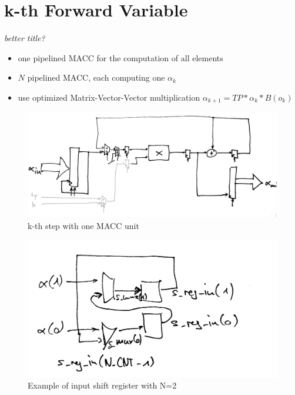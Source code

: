 \documentclass[mscthesis]{usiinfthesis}
\begin{document}
\section{k-th Forward Variable}
\emph{\color{red}better title?}

\begin{itemize}
    \item one pipelined MACC for the computation of all elements
    \item $ N $ pipelined MACC, each computing one $ \alpha_k $
    \item use optimized Matrix-Vector-Vector multiplication
        $ \alpha_{k+1} = TP * \alpha_k * B(o_k) $
        \cite{FCCM12_Kestur, ITNG07_Yang}
\end{itemize}

\begin{figure}
    \includegraphics[width=1\columnwidth]{./schema/arch_step_s.png}
    \caption{k-th step with one MACC unit}
    \label{fig:step_s}
\end{figure}
\begin{figure}
    \includegraphics[width=1\columnwidth]{./schema/arch_shift_reg_s.png}
    \caption{Example of input shift register with N=2}
    \label{fig:shift_reg_s}
\end{figure}
\end{document}
